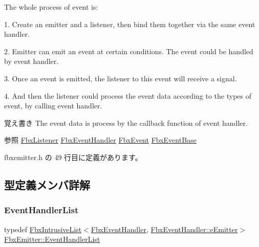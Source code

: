 \begin{DoxyItemize}
\begin{DoxyParagraph}{The whole process of event is\+:}
\end{DoxyParagraph}
\item 1. Create an emitter and a listener, then bind them together via the same event handler. \item 2. Emitter can emit an event at certain conditions. The event could be handled by event handler. \item 3. Once an event is emitted, the listener to this event will receive a signal. \item 4. And then the listener could process the event data according to the types of event, by calling event handler. \begin{DoxyNote}{覚え書き}
The event data is process by the callback function of event handler.
\end{DoxyNote}
\begin{DoxySeeAlso}{参照}
\hyperlink{class_fbx_listener}{Fbx\+Listener} \hyperlink{class_fbx_event_handler}{Fbx\+Event\+Handler} \hyperlink{class_fbx_event}{Fbx\+Event} \hyperlink{class_fbx_event_base}{Fbx\+Event\+Base} 
\end{DoxySeeAlso}
\end{DoxyItemize}


 fbxemitter.\+h の 49 行目に定義があります。



\subsection{型定義メンバ詳解}
\mbox{\label{class_fbx_emitter_a9ac3cddf1a246e71957e4b7db6c08fc1}} 
\subsubsection{\texorpdfstring{Event\+Handler\+List}{EventHandlerList}}
{\footnotesize\ttfamily typedef \hyperlink{class_fbx_intrusive_list}{Fbx\+Intrusive\+List}$<$\hyperlink{class_fbx_event_handler}{Fbx\+Event\+Handler}, \hyperlink{class_fbx_event_handler_a47139da2cfd5abee91664d75c4fb577cae2c0d7da494cef8d787ee3495e24a6c0}{Fbx\+Event\+Handler\+::e\+Emitter}$>$ \hyperlink{class_fbx_emitter_a9ac3cddf1a246e71957e4b7db6c08fc1}{Fbx\+Emitter\+::\+Event\+Handler\+List}\hspace{0.3cm}{\ttfamily [protected]}}



